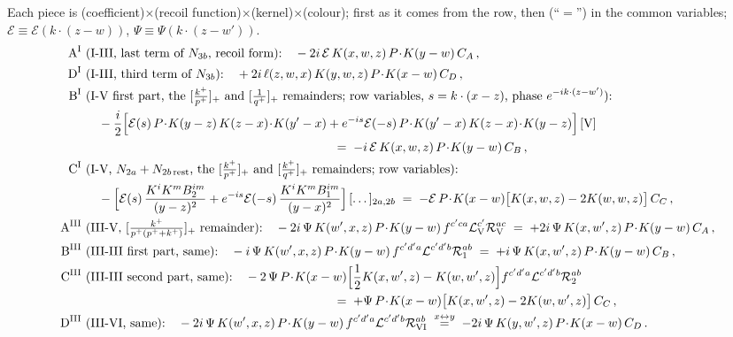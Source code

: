 \noindent Each piece is (coefficient)$\times$(recoil function)$\times$(kernel)$\times$(colour); first as it comes from the row, then (``$=$'') in the common variables; $\mathcal{E}\equiv\mathcal{E}(k\cdot(z-w))$, $\Psi\equiv\Psi(k\cdot(z-w'))$.
\begin{align}
\text{A}^{\rm I}\ &\text{(I-III, last term of $N_{3b}$, recoil form):}\quad -2i\,\mathcal{E}\,K(x,w,z)\,P\!\cdot\!K(y-w)\,C_{A}\,,\notag\\
\text{D}^{\rm I}\ &\text{(I-III, third term of $N_{3b}$):}\quad +2i\,\ell(z,w,x)\,K(y,w,z)\,P\!\cdot\!K(x-w)\,C_{D}\,,\notag\\
\text{B}^{\rm I}\ &\text{(I-V first part, the $[\tfrac{k^{+}}{p^{+}}]_{+}$ and $[\tfrac{1}{q^{+}}]_{+}$ remainders; row variables, $s=k\cdot(x-z)$, phase $e^{-ik\cdot(z-w')}$):}\notag\\
&\quad-\frac{i}{2}\Big[\mathcal{E}(s)\,P\!\cdot\!K(y-z)\,K(z-x)\!\cdot\!K(y'-x)+e^{-is}\mathcal{E}(-s)\,P\!\cdot\!K(y'-x)\,K(z-x)\!\cdot\!K(y-z)\Big]\,[\text{V}]\notag\\
&\hspace{20em}=\;-i\,\mathcal{E}\,K(x,w,z)\,P\!\cdot\!K(y-w)\,C_{B}\,,\notag\\
\text{C}^{\rm I}\ &\text{(I-V, $N_{2a}+N_{2b\,\rm rest}$, the $[\tfrac{k^{+}}{p^{+}}]_{+}$ and $[\tfrac{k^{+}}{q^{+}}]_{+}$ remainders; row variables):}\notag\\
&\quad-\Big[\mathcal{E}(s)\,\frac{K^{i}K^{m}B_{2}^{im}}{(y-z)^{2}}+e^{-is}\mathcal{E}(-s)\,\frac{K^{i}K^{m}B_{1}^{im}}{(y-x)^{2}}\Big]\,[\dots]_{2a,2b}
\;=\;-\mathcal{E}\,P\!\cdot\!K(x-w)\big[K(x,w,z)-2K(w,w,z)\big]\,C_{C}\,,\notag\\
\text{A}^{\rm III}\ &\text{(III-V, $[\tfrac{k^{+}}{p^{+}(p^{+}+k^{+})}]_{+}$ remainder):}\quad-2i\,\Psi\,K(w',x,z)\,P\!\cdot\!K(y-w)\,f^{c'ca}\mathcal{L}_{\rm V}^{c'}\mathcal{R}_{\rm V}^{ac}\;=\;+2i\,\Psi\,K(x,w',z)\,P\!\cdot\!K(y-w)\,C_{A}\,,\label{sf:pieces}\\
\text{B}^{\rm III}\ &\text{(III-III first part, same):}\quad-i\,\Psi\,K(w',x,z)\,P\!\cdot\!K(y-w)\,f^{c'd'a}\mathcal{L}^{c'd'b}\mathcal{R}_{1}^{ab}\;=\;+i\,\Psi\,K(x,w',z)\,P\!\cdot\!K(y-w)\,C_{B}\,,\notag\\
\text{C}^{\rm III}\ &\text{(III-III second part, same):}\quad-2\,\Psi\,P\!\cdot\!K(x-w)\Big[\frac12K(x,w',z)-K(w,w',z)\Big]f^{c'd'a}\mathcal{L}^{c'd'b}\mathcal{R}_{2}^{ab}\notag\\
&\hspace{20em}=\;+\Psi\,P\!\cdot\!K(x-w)\big[K(x,w',z)-2K(w,w',z)\big]\,C_{C}\,,\notag\\
\text{D}^{\rm III}\ &\text{(III-VI, same):}\quad-2i\,\Psi\,K(w',x,z)\,P\!\cdot\!K(y-w)\,f^{c'd'a}\mathcal{L}^{c'd'b}\mathcal{R}_{\rm VI}^{ab}\;\overset{x\leftrightarrow y}{=}\;-2i\,\Psi\,K(y,w',z)\,P\!\cdot\!K(x-w)\,C_{D}\,.\notag
\end{align}
